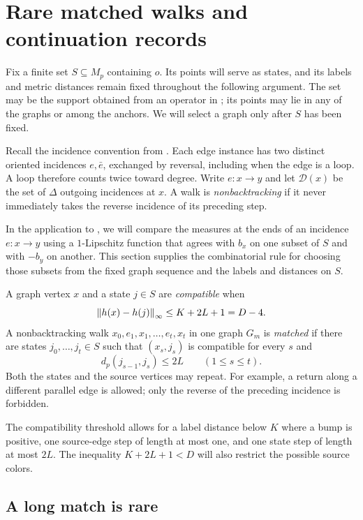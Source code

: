 \section{Rare matched walks and continuation records}\label{sec:walks}

Fix a finite set $S\subseteq M_p$ containing $o$. Its points will serve
as states, and its labels and metric distances remain fixed throughout
the following argument. The set may be the support obtained from an
operator in ; its points may lie in any of the
graphs or among the anchors. We will select a graph only after $S$ has
been fixed.

Recall the incidence convention from . Each edge
instance has two distinct oriented incidences $e,\bar e$, exchanged
by reversal, including when the edge is a loop. A loop therefore counts
twice toward degree. Write $e:x\to y$ and let $\mathcal D(x)$ be the
set of $\Delta$ outgoing incidences at $x$. A walk is
\emph{nonbacktracking} if it never immediately takes the reverse
incidence of its preceding step.

In the application to , we will compare the
measures at the ends of an incidence $e:x\to y$ using a $1$-Lipschitz
function that agrees with $b_x$ on one subset of $S$ and with $-b_y$ on
another. This section supplies the combinatorial rule for choosing those
subsets from the fixed graph sequence and the labels and distances on $S$.

A graph vertex $x$ and a state $j\in S$ are \emph{compatible} when
\[
 \left\|h(x)-h(j)\right\|_\infty\le K+2L+1=D-4.
\]
A nonbacktracking walk $x_0,e_1,x_1,\ldots,e_t,x_t$ in one graph
$G_m$ is \emph{matched} if there are states $j_0,\ldots,j_t\in S$
such that $(x_s,j_s)$ is compatible for every $s$ and
\[
 d_p(j_{s-1},j_s)\le2L\qquad(1\le s\le t).
\]
Both the states and the source vertices may repeat. For example, a
return along a different parallel edge is allowed; only the reverse
of the preceding incidence is forbidden.

The compatibility threshold allows for a label distance below $K$ where
a bump is positive, one source-edge step of length at most one, and one
state step of length at most $2L$. The inequality $K+2L+1<D$ will also
restrict the possible source colors.

\subsection{A long match is rare}

